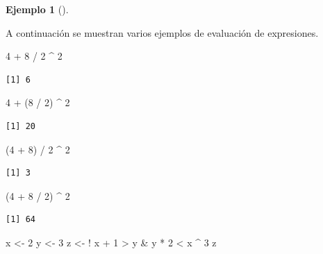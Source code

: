 \documentclass[
  a4paper,
]{scrreport}
\newenvironment{Shaded}{\begin{snugshade}}{\end{snugshade}}
\newcommand{\DecValTok}[1]{\textcolor[rgb]{0.68,0.00,0.00}{#1}}
\newcommand{\NormalTok}[1]{\textcolor[rgb]{0.00,0.23,0.31}{#1}}
\newcommand{\OtherTok}[1]{\textcolor[rgb]{0.00,0.23,0.31}{#1}}
\newcommand{\SpecialCharTok}[1]{\textcolor[rgb]{0.37,0.37,0.37}{#1}}
\theoremstyle{definition}
\theoremstyle{definition}
\newtheorem{example}{Ejemplo}[chapter]
\theoremstyle{remark}
\begin{document}
\leavevmode{}%
\begin{example}[]\label{exm-prioridad-evaluacion}

A continuación se muestran varios ejemplos de evaluación de expresiones.

\begin{Shaded}
\begin{Highlighting}[]
\DecValTok{4} \SpecialCharTok{+} \DecValTok{8} \SpecialCharTok{/} \DecValTok{2} \SpecialCharTok{\^{}} \DecValTok{2}
\end{Highlighting}
\end{Shaded}

\begin{verbatim}
[1] 6
\end{verbatim}

\begin{Shaded}
\begin{Highlighting}[]
\DecValTok{4} \SpecialCharTok{+}\NormalTok{ (}\DecValTok{8} \SpecialCharTok{/} \DecValTok{2}\NormalTok{) }\SpecialCharTok{\^{}} \DecValTok{2}
\end{Highlighting}
\end{Shaded}

\begin{verbatim}
[1] 20
\end{verbatim}

\begin{Shaded}
\begin{Highlighting}[]
\NormalTok{(}\DecValTok{4} \SpecialCharTok{+} \DecValTok{8}\NormalTok{) }\SpecialCharTok{/} \DecValTok{2} \SpecialCharTok{\^{}} \DecValTok{2}
\end{Highlighting}
\end{Shaded}

\begin{verbatim}
[1] 3
\end{verbatim}

\begin{Shaded}
\begin{Highlighting}[]
\NormalTok{(}\DecValTok{4} \SpecialCharTok{+} \DecValTok{8} \SpecialCharTok{/} \DecValTok{2}\NormalTok{) }\SpecialCharTok{\^{}} \DecValTok{2}
\end{Highlighting}
\end{Shaded}

\begin{verbatim}
[1] 64
\end{verbatim}

\begin{Shaded}
\begin{Highlighting}[]
\NormalTok{x }\OtherTok{\textless{}{-}} \DecValTok{2} 
\NormalTok{y }\OtherTok{\textless{}{-}} \DecValTok{3}
\NormalTok{z }\OtherTok{\textless{}{-}} \SpecialCharTok{!}\NormalTok{ x }\SpecialCharTok{+} \DecValTok{1} \SpecialCharTok{\textgreater{}}\NormalTok{ y }\SpecialCharTok{\&}\NormalTok{ y }\SpecialCharTok{*} \DecValTok{2}  \SpecialCharTok{\textless{}}\NormalTok{ x }\SpecialCharTok{\^{}} \DecValTok{3}
\NormalTok{z}
\end{Highlighting}
\end{Shaded}


\end{example}
\end{document}
